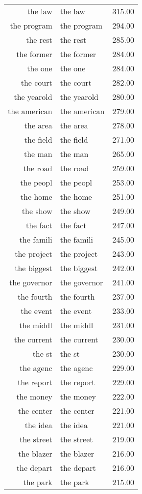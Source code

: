\begin{table}[ht]
\begin{tabular}{rlr}
  the law & the law & 315.00 \\ 
  the program & the program & 294.00 \\ 
  the rest & the rest & 285.00 \\ 
  the former & the former & 284.00 \\ 
  the one & the one & 284.00 \\ 
  the court & the court & 282.00 \\ 
  the yearold & the yearold & 280.00 \\ 
  the american & the american & 279.00 \\ 
  the area & the area & 278.00 \\ 
  the field & the field & 271.00 \\ 
  the man & the man & 265.00 \\ 
  the road & the road & 259.00 \\ 
  the peopl & the peopl & 253.00 \\ 
  the home & the home & 251.00 \\ 
  the show & the show & 249.00 \\ 
  the fact & the fact & 247.00 \\ 
  the famili & the famili & 245.00 \\ 
  the project & the project & 243.00 \\ 
  the biggest & the biggest & 242.00 \\ 
  the governor & the governor & 241.00 \\ 
  the fourth & the fourth & 237.00 \\ 
  the event & the event & 233.00 \\ 
  the middl & the middl & 231.00 \\ 
  the current & the current & 230.00 \\ 
  the st & the st & 230.00 \\ 
  the agenc & the agenc & 229.00 \\ 
  the report & the report & 229.00 \\ 
  the money & the money & 222.00 \\ 
  the center & the center & 221.00 \\ 
  the idea & the idea & 221.00 \\ 
  the street & the street & 219.00 \\ 
  the blazer & the blazer & 216.00 \\ 
  the depart & the depart & 216.00 \\ 
  the park & the park & 215.00 \\ 

\end{tabular}
\end{table}
